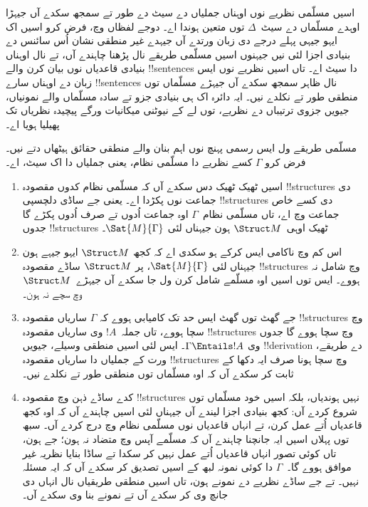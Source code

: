 \documentclass[../../../include/open-logic-section]{subfiles}
\begin{document}
\begin{explain}
اسیں مسلّمی نظریے نوں اوہناں جملیاں دے سیٹ دے طور تے سمجھ سکدے آں
جیہڑا اوہدے مسلّماں دے سیٹ~$\Delta$ توں متعین ہوندا اے۔ دوجے
لفظاں وچ، فرض کرو اسیں اک ایہو جیہی پہلے درجے دی زبان ورتدے
آں جیہدے غیر منطقی نشان اُس سائنس دے بنیادی اجزا لئی نیں
جیہنوں اسیں مسلّمی طریقے نال پڑھنا چاہندے آں، تے نال اوہناں
بنیادی قاعدیاں نوں بیان کرن والے !!{sentence}s دا سیٹ اے۔ تاں
اسیں نظریے نوں ایس زبان دے اوہناں سارے !!{sentence}s نال ظاہر
سمجھ سکدے آں جیہڑے مسلّماں توں منطقی طور تے نکلدے نیں۔
ایہ دائرہ اک ہی بنیادی جزو تے سادہ مسلّماں والے نمونیاں، جیویں
جزوی ترتیباں دے نظریے، توں لے کے نیوٹنی میکانیات ورگے
پیچیدہ نظریاں تک پھیلیا ہویا اے۔

مسلّمی طریقے ول ایس رسمی پہنچ نوں اہم بنان والے منطقی حقائق
ہیٹھاں دتے نیں۔ فرض کرو $\Gamma$ کسے نظریے دا مسلّمی نظام،
یعنی جملیاں دا اک سیٹ، اے۔
\begin{enumerate}
\item اسیں ٹھیک ٹھیک دس سکدے آں کہ مسلّمی نظام کدوں مقصودہ
  !!{structure}s دی جماعت نوں پکڑدا اے۔ یعنی جے ساڈی دلچسپی
  !!{structure}s دی کسے خاص جماعت وچ اے، تاں مسلّمی نظام~$\Gamma$
  اوہ جماعت اُدوں تے صرف اُدوں پکڑے گا جدوں !!{structure}s
  ٹھیک اوہی~$\Struct M$ ہون جیہناں لئی $\Sat{M}{\Gamma}$۔
\item اس کم وچ ناکامی ایس کرکے ہو سکدی اے کہ کجھ $\Struct M$
  ایہو جیہے ہون جیہناں لئی $\Sat{M}{\Gamma}$، پر $\Struct M$
  ساڈے مقصودہ !!{structure}s وچ شامل نہ ہووے۔ ایس توں اسیں
  اوہ مسلّمے شامل کرن ول جا سکدے آں جیہڑے~$\Struct M$ وچ سچے نہ ہون۔
\item جے گھٹ توں گھٹ ایس حد تک کامیابی ہووے کہ $\Gamma$ ساریاں
  مقصودہ !!{structure}s وچ سچا ہووے، تاں جملہ~$!A$ وی ساریاں
  مقصودہ !!{structure}s وچ سچا ہووے گا جدوں وی $\Gamma \Entails !A$۔
  ایس لئی اسیں منطقی وسیلے، جیویں !!{derivation} دے طریقے، ورت کے
  جملیاں دا ساریاں مقصودہ !!{structure}s وچ سچا ہونا صرف ایہ
  دکھا کے ثابت کر سکدے آں کہ اوہ مسلّماں توں منطقی طور تے نکلدے نیں۔
\item کدے ساڈے ذہن وچ مقصودہ !!{structure}s نہیں ہوندیاں، بلکہ
  اسیں خود مسلّماں توں شروع کردے آں: کجھ بنیادی اجزا لیندے
  آں جیہناں لئی اسیں چاہندے آں کہ اوہ کجھ قاعدیاں اُتے عمل کرن، تے انہاں
  قاعدیاں نوں مسلّمی نظام وچ درج کردے آں۔ سبھ توں پہلاں اسیں
  ایہ جانچنا چاہندے آں کہ مسلّمے آپس وچ متضاد نہ ہون؛ جے ہون،
  تاں کوئی تصور انہاں قاعدیاں اُتے عمل نہیں کر سکدا تے ساڈا
  بنایا نظریہ غیر موافق ہووے گا۔~$\Gamma$ دا کوئی نمونہ لبھ کے
  اسیں تصدیق کر سکدے آں کہ ایہ مسئلہ نہیں۔ تے جے ساڈے نظریے
  دے نمونے ہون، تاں اسیں منطقی طریقیاں نال انہاں دی جانچ وی
  کر سکدے آں تے نمونے بنا وی سکدے آں۔

\end{enumerate}
\end{explain}
\end{document}
